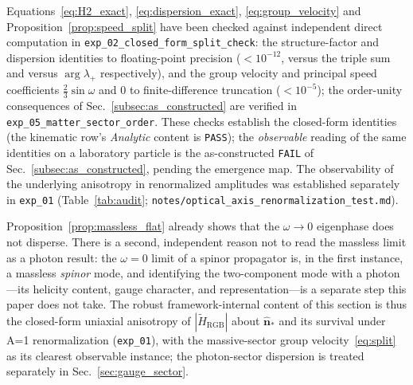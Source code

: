 Equations~\eqref{eq:H2_exact}, \eqref{eq:dispersion_exact},
\eqref{eq:group_velocity} and Proposition~\ref{prop:speed_split} have been
checked against independent direct computation in
\texttt{exp\_02\_closed\_form\_split\_check}: the structure-factor and
dispersion identities to floating-point precision ($<10^{-12}$, versus the
triple sum and versus $\arg\lambda_+$ respectively), and the group
velocity and principal speed coefficients $\tfrac23\sin\omega$ and $0$ to
finite-difference truncation ($<10^{-5}$); the order-unity consequences of
Sec.~\ref{subsec:as_constructed} are verified in
\texttt{exp\_05\_matter\_sector\_order}. These checks establish the closed-form
identities (the kinematic row's \emph{Analytic} content is \texttt{PASS}); the
\emph{observable} reading of the same identities on a laboratory particle is the
as-constructed \texttt{FAIL} of Sec.~\ref{subsec:as_constructed}, pending the
emergence map. The
observability of the underlying anisotropy in renormalized amplitudes was
established separately in \texttt{exp\_01} (Table~\ref{tab:audit};
\texttt{notes/optical\_axis\_renormalization\_test.md}).

\begin{remark}
\label{rem:photon_limit}
Proposition~\ref{prop:massless_flat} already shows that the $\omega\to0$ eigenphase
does not disperse. There is a second, independent reason not to read the massless
limit as a photon result: the $\omega=0$ limit of a spinor propagator is, in the
first instance, a massless \emph{spinor} mode, and identifying the two-component mode
with a photon---its helicity content, gauge character, and representation---is a
separate step this paper does not take. The robust framework-internal content of this
section is thus the closed-form uniaxial anisotropy of $|\tilde H_\text{RGB}|$ about
$\hat{\mathbf{n}}_*$ and its survival under A=1 renormalization (\texttt{exp\_01}),
with the massive-sector group velocity~\eqref{eq:split} as its clearest observable
instance; the photon-sector dispersion is treated separately in
Sec.~\ref{sec:gauge_sector}.
\end{remark}


